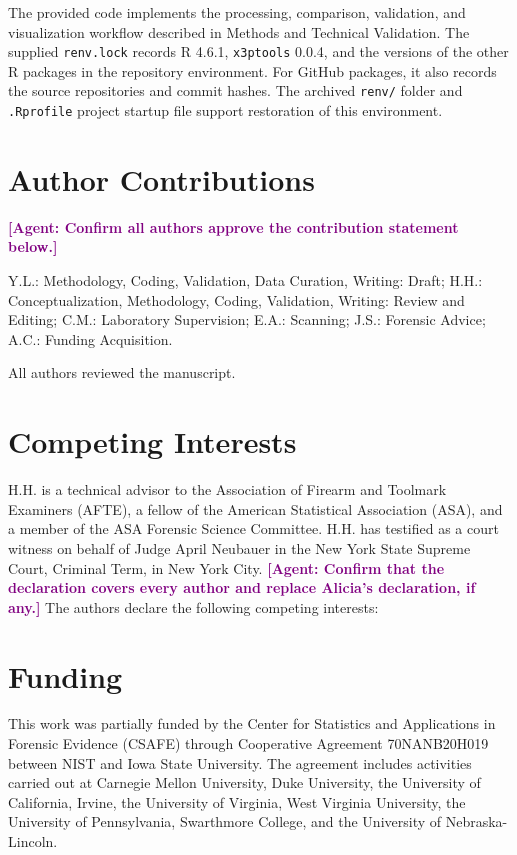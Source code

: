 \documentclass[11pt,a4paper]{article}
\newcommand{\agentformat}[1]{{\textcolor{Purple}{\textbf{[Agent: #1]}}}}
\begin{document}
\begin{table}
{}

\end{table}%

The provided code implements the processing, comparison, validation, and
visualization workflow described in Methods and Technical Validation.
The supplied \texttt{renv.lock} records R 4.6.1, \texttt{x3ptools}
0.0.4, and the versions of the other R packages in the repository
environment. For GitHub packages, it also records the source
repositories and commit hashes. The archived \texttt{renv/} folder and
\texttt{.Rprofile} project startup file support restoration of this
environment.

\renewcommand{\bibsection}{\section*{\refname}\addcontentsline{toc}{section}{\refname}}



\section*{Author Contributions}
\agentformat{Confirm all authors approve the contribution statement below.}

Y.L.: Methodology, Coding, Validation, Data Curation, Writing: Draft;
H.H.: Conceptualization, Methodology, Coding, Validation, Writing:
Review and Editing; C.M.: Laboratory Supervision; E.A.: Scanning; J.S.:
Forensic Advice; A.C.: Funding Acquisition.

All authors reviewed the manuscript.

\section*{Competing Interests}
H.H. is a technical advisor to the Association of Firearm and Toolmark
Examiners (AFTE), a fellow of the American Statistical Association
(ASA), and a member of the ASA Forensic Science Committee. H.H. has
testified as a court witness on behalf of Judge April Neubauer in the
New York State Supreme Court, Criminal Term, in New York City.
\agentformat{Confirm that the declaration covers every author and replace Alicia's declaration, if any.}
The authors declare the following competing interests:


\section*{Funding}
This work was partially funded by the Center for Statistics and
Applications in Forensic Evidence (CSAFE) through Cooperative Agreement
70NANB20H019 between NIST and Iowa State University. The agreement
includes activities carried out at Carnegie Mellon University, Duke
University, the University of California, Irvine, the University of
Virginia, West Virginia University, the University of Pennsylvania,
Swarthmore College, and the University of Nebraska-Lincoln.
\end{document}
